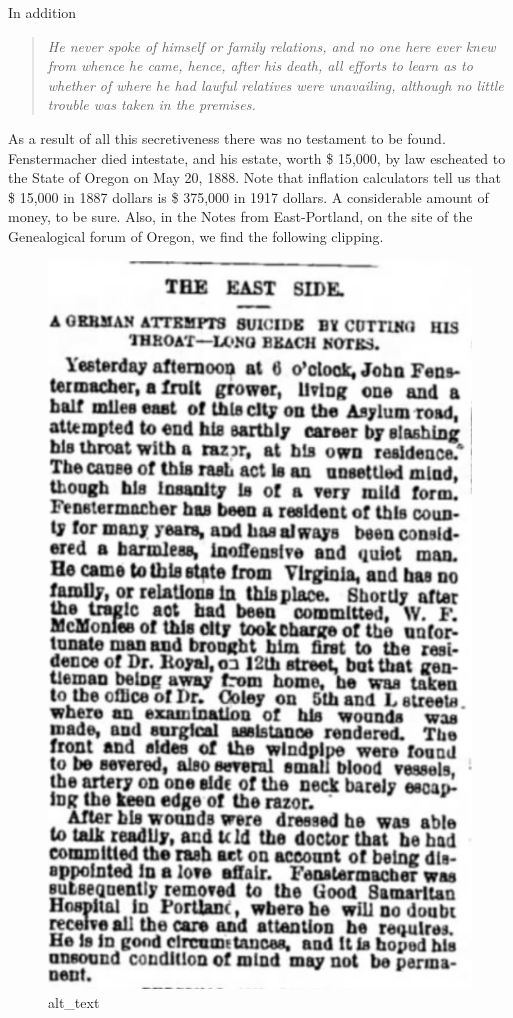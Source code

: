 \documentclass[
  12pt,
]{book}
\begin{document}
In addition

\begin{quote}
\emph{He never spoke of himself or family relations, and no one here ever knew from whence he came, hence, after his death, all efforts to learn as to whether of where he had lawful relatives were unavailing, although no little trouble was taken in the premises.}
\end{quote}

As a result of all this secretiveness there was no testament to be found. Fenstermacher died intestate, and his estate, worth \$ 15,000, by law escheated to the State of Oregon on May 20, 1888. Note that inflation calculators tell us that \$ 15,000 in 1887 dollars is \$ 375,000 in 1917 dollars. A considerable amount of money, to be sure. Also, in the Notes from East-Portland, on the site of the Genealogical forum of Oregon, we find the following clipping.

\begin{figure}
\centering
\includegraphics{images/0204b_images/image4.png}
\caption{alt\_text}
\end{figure}
\end{document}
